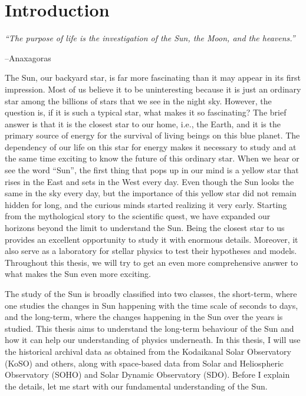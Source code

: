 \chapter{Introduction}
\label{Chap1}

\epigraph{\itshape ``The purpose of life is the investigation of the Sun, the Moon, and the heavens.''}{--Anaxagoras}

\noindent
The Sun, our backyard star, is far more fascinating than it may appear in its first impression. Most of us believe it to be uninteresting because it is just an ordinary star among the billions of stars that we see in the night sky. However, the question is, if it is such a typical star, what makes it so fascinating? The brief answer is that it is the closest star to our home, i.e., the Earth, and it is the primary source of energy for the survival of living beings on this blue planet. The dependency of our life on this star for energy makes it necessary to study and at the same time exciting to know the future of this ordinary star. When we hear or see the word ``Sun'', the first thing that pops up in our mind is a yellow star that rises in the East and sets in the West every day. Even though the Sun looks the same in the sky every day, but the importance of this yellow star did not remain hidden for long, and the curious minds started realizing it very early. Starting from the mythological story to the scientific quest, we have expanded our horizons beyond the limit to understand the Sun. Being the closest star to us provides an excellent opportunity to study it with enormous details. Moreover, it also serve as a laboratory for stellar physics to test their hypotheses and models. Throughout this thesis, we will try to get an even more comprehensive answer to what makes the Sun even more exciting.

The study of the Sun is broadly classified into two classes, the short\hyp term, where one studies the changes in Sun happening with the time scale of seconds to days, and the long\hyp term, where the changes happening in the Sun over the years is studied. This thesis aims to understand the long\hyp term behaviour of the Sun and how it can help our understanding of physics underneath. In this thesis, I will use the historical archival data as obtained from the Kodaikanal Solar Observatory (KoSO) and others, along with space-based data from Solar and Heliospheric Observatory (SOHO) and Solar Dynamic Observatory (SDO). Before I explain the details, let me start with our fundamental understanding of the Sun.

